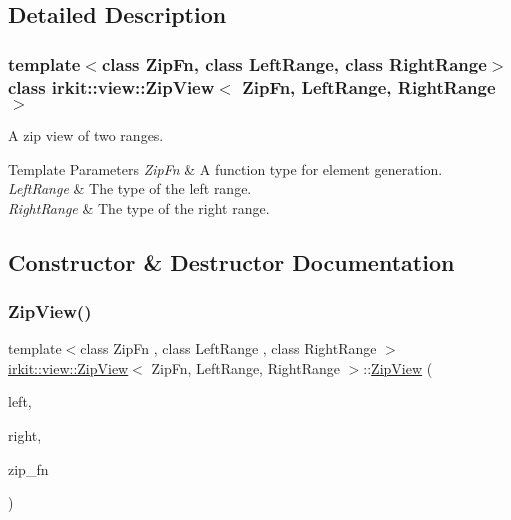 \subsection{Detailed Description}
\subsubsection*{template$<$class Zip\+Fn, class Left\+Range, class Right\+Range$>$\newline
class irkit\+::view\+::\+Zip\+View$<$ Zip\+Fn, Left\+Range, Right\+Range $>$}

A zip view of two ranges. 


\begin{DoxyTemplParams}{Template Parameters}
{\em Zip\+Fn} & A function type for element generation. \\
\hline
{\em Left\+Range} & The type of the left range. \\
\hline
{\em Right\+Range} & The type of the right range. \\
\hline
\end{DoxyTemplParams}


\subsection{Constructor \& Destructor Documentation}
\mbox{\label{classirkit_1_1view_1_1ZipView_a581e90890462717bbdac0f02dc343641}} 
\subsubsection{\texorpdfstring{Zip\+View()}{ZipView()}}
{\footnotesize\ttfamily template$<$class Zip\+Fn , class Left\+Range , class Right\+Range $>$ \\
\mbox{\hyperlink{classirkit_1_1view_1_1ZipView}{irkit\+::view\+::\+Zip\+View}}$<$ Zip\+Fn, Left\+Range, Right\+Range $>$\+::\mbox{\hyperlink{classirkit_1_1view_1_1ZipView}{Zip\+View}} (\begin{DoxyParamCaption}\item[{const Left\+Range \&}]{left,  }\item[{const Right\+Range \&}]{right,  }\item[{Zip\+Fn}]{zip\+\_\+fn }\end{DoxyParamCaption})\hspace{0.3cm}{\ttfamily [inline]}}



